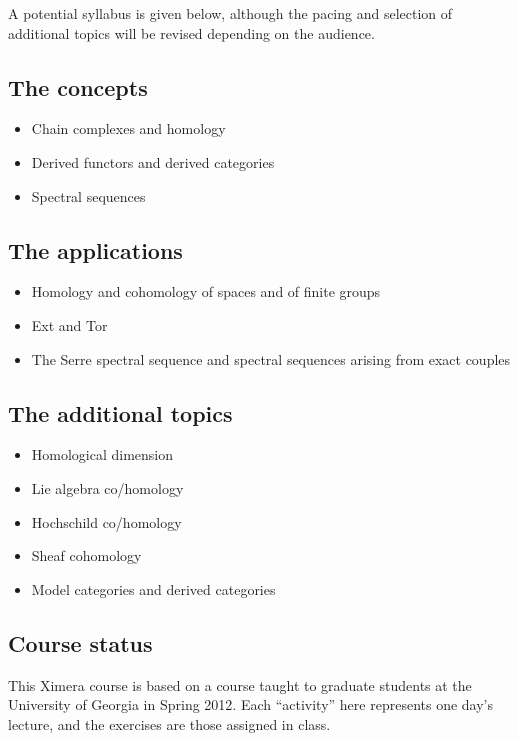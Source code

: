 \documentclass{ximera}
\begin{document}
A potential syllabus is given below, although the pacing and selection of additional topics will be revised depending on the audience.

\subsection{The concepts}

\begin{itemize}
\item Chain complexes and homology
\item Derived functors and derived categories
\item Spectral sequences
\end{itemize}

\subsection{The applications}

\begin{itemize}
\item Homology and cohomology of spaces and of finite groups
\item Ext and Tor
\item The Serre spectral sequence and spectral sequences arising from exact couples
\end{itemize}

\subsection{The additional topics}

\begin{itemize}
\item Homological dimension
\item Lie algebra co/homology
\item Hochschild co/homology
\item Sheaf cohomology
\item Model categories and derived categories
\end{itemize}



\subsection{Course status}

This Ximera course is based on a course taught to graduate students at
the University of Georgia in Spring 2012.  Each ``activity'' here
represents one day's lecture, and the exercises are those assigned in
class.
\end{document}
